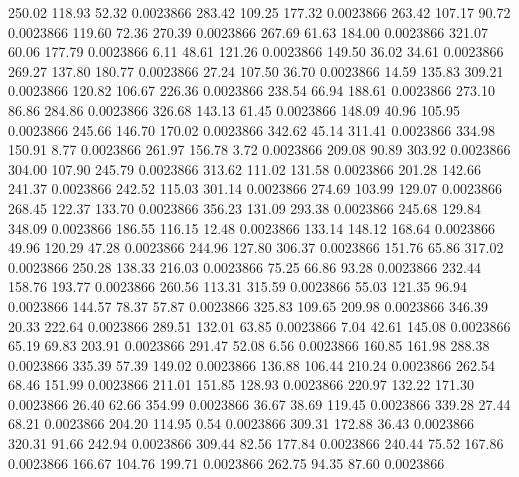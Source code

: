     250.02    118.93     52.32  0.0023866
    283.42    109.25    177.32  0.0023866
    263.42    107.17     90.72  0.0023866
    119.60     72.36    270.39  0.0023866
    267.69     61.63    184.00  0.0023866
    321.07     60.06    177.79  0.0023866
      6.11     48.61    121.26  0.0023866
    149.50     36.02     34.61  0.0023866
    269.27    137.80    180.77  0.0023866
     27.24    107.50     36.70  0.0023866
     14.59    135.83    309.21  0.0023866
    120.82    106.67    226.36  0.0023866
    238.54     66.94    188.61  0.0023866
    273.10     86.86    284.86  0.0023866
    326.68    143.13     61.45  0.0023866
    148.09     40.96    105.95  0.0023866
    245.66    146.70    170.02  0.0023866
    342.62     45.14    311.41  0.0023866
    334.98    150.91      8.77  0.0023866
    261.97    156.78      3.72  0.0023866
    209.08     90.89    303.92  0.0023866
    304.00    107.90    245.79  0.0023866
    313.62    111.02    131.58  0.0023866
    201.28    142.66    241.37  0.0023866
    242.52    115.03    301.14  0.0023866
    274.69    103.99    129.07  0.0023866
    268.45    122.37    133.70  0.0023866
    356.23    131.09    293.38  0.0023866
    245.68    129.84    348.09  0.0023866
    186.55    116.15     12.48  0.0023866
    133.14    148.12    168.64  0.0023866
     49.96    120.29     47.28  0.0023866
    244.96    127.80    306.37  0.0023866
    151.76     65.86    317.02  0.0023866
    250.28    138.33    216.03  0.0023866
     75.25     66.86     93.28  0.0023866
    232.44    158.76    193.77  0.0023866
    260.56    113.31    315.59  0.0023866
     55.03    121.35     96.94  0.0023866
    144.57     78.37     57.87  0.0023866
    325.83    109.65    209.98  0.0023866
    346.39     20.33    222.64  0.0023866
    289.51    132.01     63.85  0.0023866
      7.04     42.61    145.08  0.0023866
     65.19     69.83    203.91  0.0023866
    291.47     52.08      6.56  0.0023866
    160.85    161.98    288.38  0.0023866
    335.39     57.39    149.02  0.0023866
    136.88    106.44    210.24  0.0023866
    262.54     68.46    151.99  0.0023866
    211.01    151.85    128.93  0.0023866
    220.97    132.22    171.30  0.0023866
     26.40     62.66    354.99  0.0023866
     36.67     38.69    119.45  0.0023866
    339.28     27.44     68.21  0.0023866
    204.20    114.95      0.54  0.0023866
    309.31    172.88     36.43  0.0023866
    320.31     91.66    242.94  0.0023866
    309.44     82.56    177.84  0.0023866
    240.44     75.52    167.86  0.0023866
    166.67    104.76    199.71  0.0023866
    262.75     94.35     87.60  0.0023866
